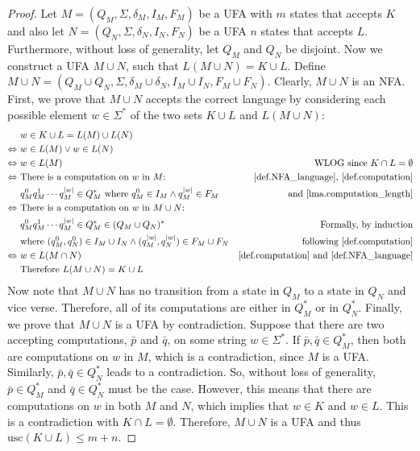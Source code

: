 \documentclass{report}
\DeclarePairedDelimiter{\abs}{\lvert}{\rvert}
\theoremstyle{definition}
\begin{document}
\begin{proof}
Let $M = (Q_M, \Sigma, \delta_M, I_M, F_M)$ be a UFA with $m$ states that accepts
$K$ and also let ${N = (Q_N, \Sigma, \delta_N, I_N, F_N)}$ be a UFA $n$ states that
accepts $L$. Furthermore, without loss of generality, let $Q_M$ and $Q_N$ be
disjoint. Now we construct a UFA $M \cup N$, such that
$L(M \cup N) = K \cup L$. Define $M \cup N = (Q_M \cup Q_N, \Sigma,
\delta_M \cup \delta_N, I_M \cup I_N, F_M \cup F_N)$.
Clearly, $M \cup N$ is an NFA. First, we prove that $M \cup N$ accepts the
correct language by considering each possible element $w \in \Sigma^{\ast}$ of the
two sets $K \cup L$ and $L(M \cup N)$:
\begin{align*}
& w \in K \cup L = L(M) \cup L(N) \\
\Leftrightarrow \ & w \in L(M) \vee w \in L(N) \\
\Leftrightarrow \ & w \in L(M)
& \text{WLOG since } K \cap L = \emptyset \\
\Leftrightarrow \ & \text{There is a computation on } w \text{ in } M \text{:}
& \text{\cref{def.NFA_language}, \cref{def.computation}} \\
& q_M^0 q_M^1 \cdots q_M^{\abs{w}} \in Q_M^{\ast}
\text{ where } q_M^0 \in I_M \wedge q_M^{\abs{w}} \in F_M
& \text{and \cref{lma.computation_length}} \\
\Leftrightarrow \ & \text{There is a computation on } w \text{ in } M \cup N
\text{:} \\
& q_M^0 q_M^1 \cdots q_M^{\abs{w}} \in Q_M^{\ast}
\in (Q_M \cup Q_N)^{\ast}
& \text{Formally, by induction} \\
& \text{where } (q_M^0, q_N^0) \in I_M \cup I_N \wedge
(q_M^{\abs{w}}, q_N^{\abs{w}}) \in F_M \cup F_N
& \text{following \cref{def.computation}} \\
\Leftrightarrow \ & w \in L(M \cap N)
& \text{\cref{def.computation} and \cref{def.NFA_language}} \\
& \text{Therefore } L(M \cup N) = K \cup L
\end{align*}
Now note that $M \cup N$ has no transition from a state in $Q_M$ to a state in
$Q_N$ and vice verse. Therefore, all of its computations are either in $Q_M^{\ast}$
or in $Q_N^{\ast}$. Finally, we prove that $M \cup N$ is a UFA by contradiction.
Suppose that there are two accepting computations, $\bar{p}$ and $\bar{q}$,
on some string $w \in \Sigma^{\ast}$. If $\bar{p}, \bar{q} \in Q_M^{\ast}$, then both
are computations on $w$ in $M$, which is a contradiction, since $M$ is a UFA.
Similarly, $\bar{p}, \bar{q} \in Q_N^{\ast}$ leads to a contradiction. So,
without loss of generality, $\bar{p} \in Q_M^{\ast}$ and $\bar{q} \in Q_N^{\ast}$
must be the case. However, this means that there are computations on $w$ in both
$M$ and $N$, which implies that $w \in K$ and $w \in L$. This is a contradiction
with $K \cap L = \emptyset$. Therefore, $M \cup N$ is a UFA and thus
$\mathrm{usc}(K \cup L) \leq m + n$.
\end{proof}
\end{document}
